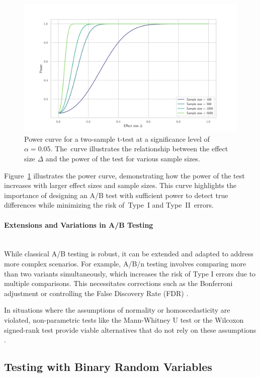 \documentclass[magisterska, english]{pwr_wmat_praca_dyplomowa}
\theoremstyle{plain}
\numberwithin{theorem}{chapter}
\theoremstyle{definition}
\numberwithin{theorem}{chapter}
\newcommand{\myparagraph}[1]{\paragraph{#1}\mbox{}\\}
\begin{document}
\begin{figure}[H]
	\centering
	\includegraphics[width=\textwidth]{images/power_curve.png}
	\caption{Power curve for a two-sample t-test at a significance level of $\alpha = 0.05$. The~curve illustrates the relationship between the effect size $\Delta$ and the power of the test for various sample sizes.}
	\label{fig:power_curve}
\end{figure}
Figure~\ref{fig:power_curve} illustrates the power curve, demonstrating how the power of the test increases with larger effect sizes and sample sizes. This curve highlights the importance of designing an A/B test with sufficient power to detect true differences while minimizing the risk of~Type~I and Type~II~errors.

\myparagraph{Extensions and Variations in A/B Testing}

While classical A/B testing is robust, it can be extended and adapted to address more complex scenarios. For example, A/B/n testing involves comparing more than two variants simultaneously, which increases the risk of Type I errors due to multiple comparisons. This necessitates corrections such as the Bonferroni adjustment or controlling the False Discovery Rate (FDR) \cite{Benjamini1995, Holm1979}.

In situations where the assumptions of normality or homoscedasticity are violated, non-parametric tests like the Mann-Whitney U test or the Wilcoxon signed-rank test provide viable alternatives that do not rely on these assumptions \cite{Hollander2013}.

\subsection{Testing with Binary Random Variables}
\end{document}
